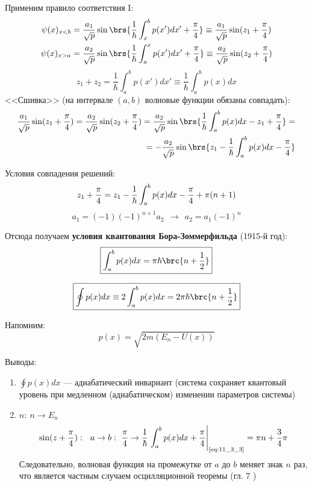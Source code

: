 Применим правило соответствия I:
$$
\begin{gathered}
\psi(x)_{x<b} = \frac{a_1}{\sqrt{p}} \sin\brs{\frac{1}{\hbar} \int_{x}^{b} p(x')dx' + \frac{\pi}{4} } \equiv \frac{a_1}{\sqrt{p}} \sin({z_1 + \frac{\pi}{4}}) \\
\psi(x)_{x>a} = \frac{a_2}{\sqrt{p}} \sin\brs{\frac{1}{\hbar} \int_{a}^{x} p(x')dx' + \frac{\pi}{4} } \equiv \frac{a_2}{\sqrt{p}} \sin({z_2 + \frac{\pi}{4}})
\end{gathered}
$$
$$
z_1+z_2 = \frac{1}{\hbar} \int_{a}^{b} p(x')dx' \equiv \frac{1}{\hbar} \int_{a}^{b} p(x)dx
$$
<<Сшивка>> (на интервале $(a, b)$ волновые функции обязаны совпадать):
$$
\begin{aligned}
\frac{a_1}{\sqrt{p}} \sin({z_1+\frac{\pi}{4}}) = \frac{a_2}{\sqrt{p}} \sin({z_2+\frac{\pi}{4}}) = \frac{a_2}{\sqrt{p}} \sin\brs{\frac{1}{\hbar} \int_{a}^{b} p(x)dx - z_1 + \frac{\pi}{4}} = \\
= -\frac{a_2}{\sqrt{p}} \sin\brs{z_1 - \frac{1}{\hbar} \int_{a}^{b} p(x)dx - \frac{\pi}{4} }
\end{aligned}
$$

Условия совпадения решений:
\begin{equation}
\label{eq:11_3_1}
z_1 + \frac{\pi}{4} = z_1 - \frac{1}{\hbar} \int_{a}^{b} p(x)dx - \frac{\pi}{4} + \pi(n+1) \\
\end{equation}
\begin{equation}
\label{eq:11_3_2}
a_1 = (-1)(-1)^{n+1}a_2  ~~\rightarrow~~ a_2 = a_1 (-1)^n
\end{equation}

Отсюда получаем \textbf{условия квантования Бора-Зоммерфильда} (1915-й год):
\begin{equation}
\label{eq:11_3_3}
\boxed{\int_{a}^{b} p(x)dx = \pi\hbar\brc{n+\frac{1}{2}}}
\end{equation}

\begin{equation}
\label{eq:11_3_4}
\boxed{\oint p(x)dx \equiv 2 \int_{a}^{b} p(x)dx = 2\pi\hbar\brc{n+\frac{1}{2}}}
\end{equation}

Напомним:
$$
p(x) = \sqrt{2m(E_n - U(x))}
$$

Выводы:
\begin{enumerate}
\item $\oint p(x)dx $ --- адиабатический инвариант (система сохраняет квантовый уровень при медленном (адиабатическом) изменении параметров системы)
\item $n:~ n \to E_n$
$$
\sin({z+\frac{\pi}{4}}):~~ a \to b:~ \frac{\pi}{4} \to \frac{1}{\hbar} \left. \int_{a}^{b} p(x)dx + \frac{\pi}{4} \right|_{\text{\eqref{eq:11_3_3}}} =
\pi n + \frac{3}{4}\pi
$$
Следовательно, волновая функция на промежутке от $a$ до $b$ меняет знак $n$ раз, что является частным случаем осцилляционной теоремы (гл. 7 )
\end{enumerate}

